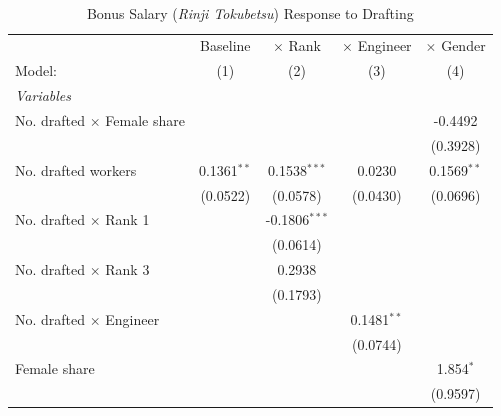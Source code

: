 \begin{table}[htbp]
\centering
\caption{Bonus Salary (\emph{Rinji Tokubetsu}) Response to Drafting}
\label{tab:rinji}
\begin{threeparttable}
 \\[4pt]
\begin{tabular}{lcccc}
   \tabularnewline \midrule \midrule
                                      & Baseline      & $\times$ Rank   & $\times$ Engineer  & $\times$ Gender \\    
   Model:                             & (1)           & (2)             & (3)                & (4)\\  
   \midrule
   \emph{Variables}\\
   No. drafted $\times$ Female share  &               &                 &                    & -0.4492\\   
                                      &               &                 &                    & (0.3928)\\   
   No. drafted workers                & 0.1361$^{**}$ & 0.1538$^{***}$  & 0.0230             & 0.1569$^{**}$\\   
                                      & (0.0522)      & (0.0578)        & (0.0430)           & (0.0696)\\   
   No. drafted $\times$ Rank 1        &               & -0.1806$^{***}$ &                    &   \\   
                                      &               & (0.0614)        &                    &   \\   
   No. drafted $\times$ Rank 3        &               & 0.2938          &                    &   \\   
                                      &               & (0.1793)        &                    &   \\   
   No. drafted $\times$ Engineer      &               &                 & 0.1481$^{**}$      &   \\   
                                      &               &                 & (0.0744)           &   \\   
   Female share                       &               &                 &                    & 1.854$^{*}$\\   
                                      &               &                 &                    & (0.9597)\\   
   \midrule

\end{tabular}
\end{threeparttable}
\end{table}
